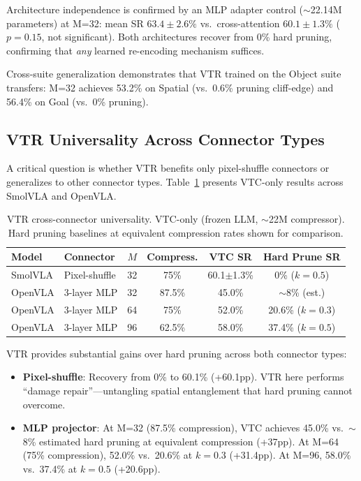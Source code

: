 \documentclass[letterpaper]{article}
\begin{document}
Architecture independence is confirmed by an MLP adapter control ($\sim$22.14M parameters) at M=32: mean SR $63.4\pm2.6\%$ vs.\ cross-attention $60.1\pm1.3\%$ ($p=0.15$, not significant). Both architectures recover from 0\% hard pruning, confirming that \emph{any} learned re-encoding mechanism suffices.

Cross-suite generalization demonstrates that VTR trained on the Object suite transfers: M=32 achieves 53.2\% on Spatial (vs.\ 0.6\% pruning cliff-edge) and 56.4\% on Goal (vs.\ 0\% pruning).

\subsection{VTR Universality Across Connector Types}

A critical question is whether VTR benefits only pixel-shuffle connectors or generalizes to other connector types. Table~\ref{tab:vtr_universal} presents VTC-only results across SmolVLA and OpenVLA.

\begin{table}[h]
\centering
\caption{VTR cross-connector universality. VTC-only (frozen LLM, $\sim$22M compressor). Hard pruning baselines at equivalent compression rates shown for comparison.}
\label{tab:vtr_universal}
\small
\begin{tabular}{llcccc}
\toprule
\textbf{Model} & \textbf{Connector} & $M$ & \textbf{Compress.} & \textbf{VTC SR} & \textbf{Hard Prune SR} \\
\midrule
SmolVLA & Pixel-shuffle & 32 & 75\% & 60.1$\pm$1.3\% & 0\% ($k{=}0.5$) \\
OpenVLA & 3-layer MLP & 32 & 87.5\% & 45.0\% & $\sim$8\% (est.) \\
OpenVLA & 3-layer MLP & 64 & 75\% & 52.0\% & 20.6\% ($k{=}0.3$) \\
OpenVLA & 3-layer MLP & 96 & 62.5\% & 58.0\% & 37.4\% ($k{=}0.5$) \\
\bottomrule
\end{tabular}
\end{table}

VTR provides substantial gains over hard pruning across both connector types:
\begin{itemize}
    \item \textbf{Pixel-shuffle}: Recovery from 0\% to 60.1\% (+60.1pp). VTR here performs ``damage repair''---untangling spatial entanglement that hard pruning cannot overcome.
    \item \textbf{MLP projector}: At M=32 (87.5\% compression), VTC achieves 45.0\% vs.\ $\sim$8\% estimated hard pruning at equivalent compression (+37pp). At M=64 (75\% compression), 52.0\% vs.\ 20.6\% at $k=0.3$ (+31.4pp). At M=96, 58.0\% vs.\ 37.4\% at $k=0.5$ (+20.6pp).
\end{itemize}
\end{document}
